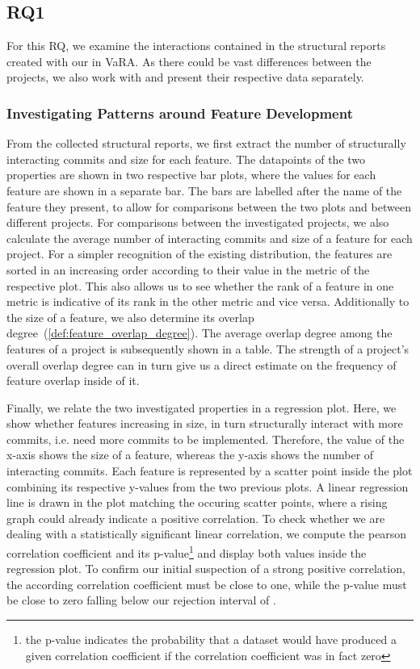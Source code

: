 \subsection{\textbf{RQ1}}\label{sec:op:RQ1}

For this RQ, we examine the interactions contained in the structural reports created with our  in VaRA.
As there could be vast differences between the projects, we also work with and present their respective data separately.

\subsubsection*{Investigating Patterns around Feature Development}

From the collected structural reports, we first extract the number of structurally interacting commits and size for each feature.
The datapoints of the two properties are shown in two respective bar plots, where the values for each feature are shown in a separate bar.
The bars are labelled after the name of the feature they present, to allow for comparisons between the two plots and between different projects.
For comparisons between the investigated projects, we also calculate the average number of interacting commits and size of a feature for each project.
For a simpler recognition of the existing distribution, the features are sorted in an increasing order according to their value in the metric of the respective plot.
This also allows us to see whether the rank of a feature in one metric is indicative of its rank in the other metric and vice versa.
Additionally to the size of a feature, we also determine its overlap degree~(\ref{def:feature_overlap_degree}).
The average overlap degree among the features of a project is subsequently shown in a table.
The strength of a project's overall overlap degree can in turn give us a direct estimate on the frequency of feature overlap inside of it.

Finally, we relate the two investigated properties in a regression plot.
Here, we show whether features increasing in size, in turn structurally interact with more commits, i.e. need more commits to be implemented.
Therefore, the value of the x-axis shows the size of a feature, whereas the y-axis shows the number of interacting commits.
Each feature is represented by a scatter point inside the plot combining its respective y-values from the two previous plots.
A linear regression line is drawn in the plot matching the occuring scatter points, where a rising graph could already indicate a positive correlation.
To check whether we are dealing with a statistically significant linear correlation, we compute the pearson correlation coefficient and its p-value\footnote{the p-value indicates the probability that a dataset would have produced a given correlation coefficient if the correlation coefficient was in fact zero} and display both values inside the regression plot.
To confirm our initial suspection of a strong positive correlation, the according correlation coefficient must be close to one, while the p-value must be close to zero falling below our rejection interval of .

